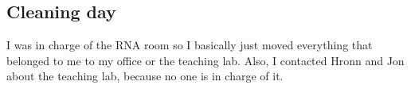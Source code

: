 \subsection{Cleaning day}
\label{task:20180222_cj0}

I was in charge of the RNA room so I basically just moved everything that belonged to me to my office or the teaching lab. Also, I contacted Hronn and Jon about the teaching lab, because no one is in charge of it.
